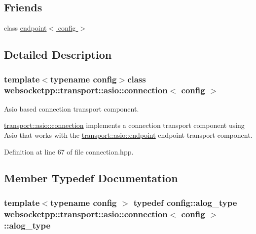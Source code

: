 \subsection*{Friends}
\begin{DoxyCompactItemize}
\item 
class \hyperlink{classwebsocketpp_1_1transport_1_1asio_1_1connection_ad7f0fad4f6837f8f4e97cf905b3a231f}{endpoint$<$ config $>$}
\end{DoxyCompactItemize}


\subsection{Detailed Description}
\subsubsection*{template$<$typename config$>$class websocketpp\+::transport\+::asio\+::connection$<$ config $>$}

Asio based connection transport component. 

\hyperlink{classwebsocketpp_1_1transport_1_1asio_1_1connection}{transport\+::asio\+::connection} implements a connection transport component using Asio that works with the \hyperlink{classwebsocketpp_1_1transport_1_1asio_1_1endpoint}{transport\+::asio\+::endpoint} endpoint transport component. 

Definition at line 67 of file connection.\+hpp.



\subsection{Member Typedef Documentation}
\hypertarget{classwebsocketpp_1_1transport_1_1asio_1_1connection_a457470621386c06374aa3bd189a4715e}{}
\subsubsection[{alog\+\_\+type}]{\setlength{\rightskip}{0pt plus 5cm}template$<$typename config $>$ typedef config\+::alog\+\_\+type {\bf websocketpp\+::transport\+::asio\+::connection}$<$ config $>$\+::{\bf alog\+\_\+type}}\label{classwebsocketpp_1_1transport_1_1asio_1_1connection_a457470621386c06374aa3bd189a4715e}


